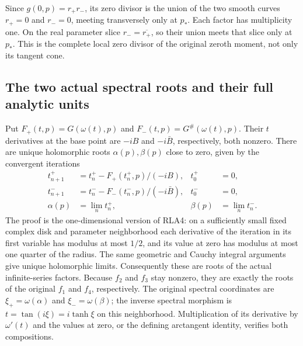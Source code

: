 \documentclass[11pt]{article}
\begin{document}
Since $g(0,p)=r_+r_-$, its zero divisor is the union of the two
smooth curves $r_+=0$ and $r_-=0$, meeting transversely only at $p_*$.
Each factor has multiplicity one.  On the real parameter slice
$r_-=\overline{r_+}$, so their union meets that slice only at $p_*$.
This is the complete local zero divisor of the original zeroth
moment, not only its tangent cone.

\subsection{The two actual spectral roots and their full analytic units}

Put $F_+(t,p)=G(\omega(t),p)$ and
$F_-(t,p)=G^\#(\omega(t),p)$.
Their $t$ derivatives at the base point are $-iB$ and
$-i\bar B$, respectively, both nonzero.  There are unique
holomorphic roots $\alpha(p),\beta(p)$ close to zero, given by the
convergent iterations
\[
\begin{aligned}
 t^+_{n+1}&=t^+_n-F_+(t^+_n,p)/(-iB),&t^+_0&=0,\\
 t^-_{n+1}&=t^-_n-F_-(t^-_n,p)/(-i\bar B),&t^-_0&=0,\\
 \alpha(p)&=\lim_nt^+_n,&\beta(p)&=\lim_nt^-_n.
\end{aligned}\tag{RLA5}
\]
The proof is the one-dimensional version of RLA4: on a sufficiently
small fixed complex disk and parameter neighborhood each derivative
of the iteration in its first variable has modulus at most $1/2$,
and its value at zero has modulus at most one quarter of the radius.
The same geometric and Cauchy integral arguments give unique
holomorphic limits.  Consequently these are roots of the actual
infinite-series factors.  Because $f_2$ and $f_3$ stay nonzero, they
are exactly the roots of the original $f_1$ and $f_4$, respectively.
The original spectral coordinates are
$\xi_+=\omega(\alpha)$ and $\xi_-=\omega(\beta)$; the inverse
spectral morphism is $t=\tan(i\xi)=i\tanh\xi$ on this neighborhood.
Multiplication of its derivative by $\omega'(t)$ and the values at
zero, or the defining arctangent identity, verifies both compositions.
\end{document}
